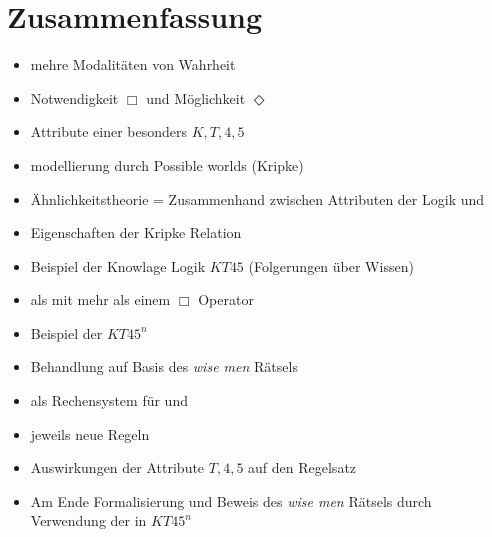 
\chapter{Zusammenfassung} %
\label{sec:zusammenfassung}

\begin{itemize}
	\item \ML mehre Modalitäten von Wahrheit
	\item Notwendigkeit $\Box$ und Möglichkeit $\Diamond$
	\item Attribute einer \ML besonders $K,T,4,5$
	\item modellierung durch Possible worlds (Kripke)
	\item Ähnlichkeitstheorie = Zusammenhand zwischen Attributen der Logik und 
	\item Eigenschaften der Kripke Relation
	\item Beispiel der Knowlage Logik $KT45$ (Folgerungen über Wissen)
	\item \MML als \ML mit mehr als einem $\Box$ Operator
	\item Beispiel der $KT45^n$
	\item Behandlung auf Basis des \emph{wise men} Rätsels
	\item \ND als Rechensystem für \AL \ML und \MML
	\item jeweils neue Regeln
	\item Auswirkungen der Attribute $T,4,5$ auf den Regelsatz
	\item Am Ende Formalisierung und Beweis des \emph{wise men} Rätsels durch Verwendung der \ND in $KT45^n$
\end{itemize}


